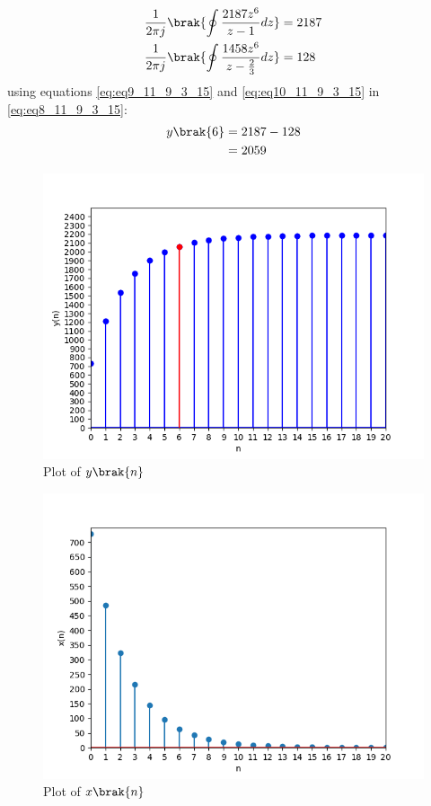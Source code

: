 \documentclass[journal,12pt,twocolumn]{IEEEtran}
\theoremstyle{remark}
\begin{document}
\begin{align}
    \frac{1}{2\pi j}\brak{\oint\frac{2187z^{6}}{z - 1}dz} &= 2187\label{eq:eq9_11_9_3_15}\\
     \frac{1}{2\pi j}\brak{\oint\frac{1458z^{6}}{z - \frac{2}{3}}dz}  &= 128\label{eq:eq10_11_9_3_15}
     \end{align}
using equations \eqref{eq:eq9_11_9_3_15} and \eqref{eq:eq10_11_9_3_15} in \eqref{eq:eq8_11_9_3_15}:
\begin{align}
y\brak{6} &= 2187 - 128\\
&= 2059
\end{align}

\begin{figure}[!ht]
\centering
\begin{center}
\includegraphics[width=\columnwidth]{ncert-maths/11/9/3/15/figs/Figure_1.png}
\end{center}
\caption{Plot of $y\brak{n}$}
\end{figure}
\begin{figure}[!ht]
\centering
\begin{center}
\includegraphics[width=\columnwidth]{ncert-maths/11/9/3/15/figs/Figure_2.png}
\end{center}
\caption{Plot of $x\brak{n}$}
\end{figure}
\end{document}

